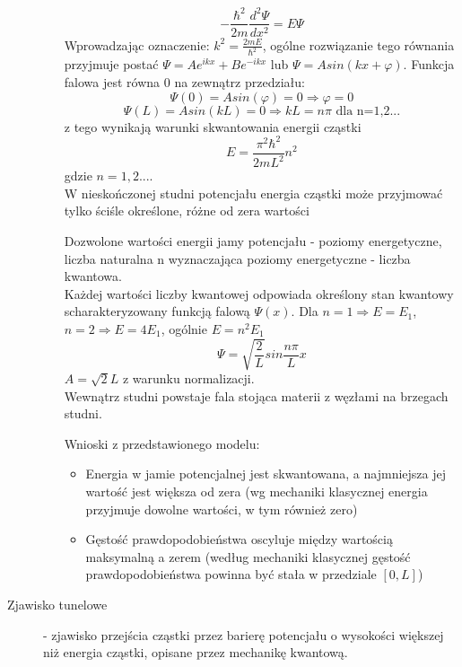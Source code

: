 \documentclass[a4paper,11pt]{article}
\begin{document}
\begin{description}
\begin{enumerate}
    $$-\frac{\hbar^2}{2m}\frac{d^2\Psi}{dx^2}=E\Psi$$
    Wprowadzając oznaczenie: $k^2=\frac{2mE}{\hbar^2}$, ogólne rozwiązanie tego równania przyjmuje postać $\Psi=Ae^{ikx}+Be^{-ikx}$ lub $\Psi=Asin(kx+\varphi)$. Funkcja falowa jest równa 0 na zewnątrz przedziału: 
    $$\Psi(0) = Asin(\varphi)=0\Rightarrow\varphi=0$$
    $$\Psi(L)=Asin(kL)=0\Rightarrow kL=n\pi\text{ dla n=1,2...}$$
    z tego wynikają warunki skwantowania energii cząstki
    $$E=\frac{\pi^2\hbar^2}{2mL^2}n^2$$
    gdzie $n=1,2...$. \\
    W nieskończonej studni potencjału energia cząstki może przyjmować tylko ściśle określone, różne od zera wartości

    Dozwolone wartości energii jamy potencjału - poziomy energetyczne, liczba naturalna n wyznaczająca poziomy energetyczne - liczba kwantowa.\\
    Każdej wartości liczby kwantowej odpowiada określony stan kwantowy scharakteryzowany funkcją falową $\Psi(x)$.
    Dla $n=1 \Rightarrow E=E_1$, $n=2 \Rightarrow E=4E_1$, ogólnie $E=n^2E_1$
    $$\Psi=\sqrt{\frac{2}{L}}sin\frac{n\pi}{L}x$$
    $A=\sqrt{2}{L}$ z warunku normalizacji.\\
    Wewnątrz studni powstaje fala stojąca materii z węzłami na brzegach studni.

    Wnioski z przedstawionego modelu:
    \begin{itemize}
    \item Energia w jamie potencjalnej jest skwantowana, a najmniejsza jej wartość jest większa od zera (wg mechaniki klasycznej energia przyjmuje dowolne wartości, w tym również zero)
    \item Gęstość prawdopodobieństwa oscyluje między wartością maksymalną a zerem (według mechaniki klasycznej gęstość prawdopodobieństwa powinna być stała w przedziale $[0,L]$)
    \end{itemize}
  \end{enumerate}
\item[Zjawisko tunelowe] - zjawisko przejścia cząstki przez barierę potencjału o wysokości większej niż energia cząstki, opisane przez mechanikę kwantową.


\end{description}
\end{document}
